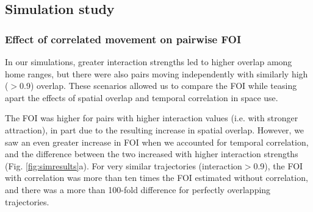 \documentclass[letterpaper]{article}
\begin{document}

\subsection*{Simulation study}

\subsubsection*{Effect of correlated movement on pairwise FOI}

In our simulations, greater interaction strengths led to higher overlap among home ranges, but there were also pairs moving independently with similarly high  ($>$0.9) overlap. 
These scenarios allowed us to compare the FOI while teasing apart the effects of spatial overlap and temporal correlation in space use. 

The FOI was higher for pairs with higher interaction values (i.e. with stronger attraction), in part due to the resulting increase in spatial overlap. 
However, we saw an even greater increase in FOI when we accounted for temporal correlation, and the difference between the two increased with higher interaction strengths (Fig. \ref{fig:simresults}a). For very similar trajectories (interaction$>$0.9), the FOI with correlation was more than ten times the FOI estimated without correlation, and there was a more than 100-fold difference for perfectly overlapping trajectories.  
\end{document}
